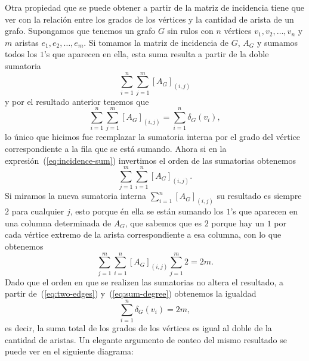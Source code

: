 Otra propiedad que se puede obtener a partir de la matriz de incidencia tiene que ver con la relación entre los grados de los vértices y la cantidad de arista de un grafo.
Supongamos que tenemos un grafo $G$ sin rulos con $n$ vértices $v_1,v_2,\ldots,v_n$ y $m$ aristas $e_1,e_2,\ldots,e_m$.
Si tomamos la matriz de incidencia de $G$, $A_G$ y sumamos todos los $1$'s que aparecen en ella, esta suma resulta a partir de la doble sumatoria
\begin{equation}\label{eq:incidence-sum}
\sum_{i=1}^{n}\sum_{j=1}^{m}[A_G]_{(i,j)}
\end{equation}
y por el resultado anterior tenemos que
\begin{equation}\label{eq:sum-degree}
\sum_{i=1}^{n}\sum_{j=1}^{m}[A_G]_{(i,j)}=\sum_{i=1}^{n}\delta_G(v_i),
\end{equation}
lo único que hicimos fue reemplazar la sumatoria interna por el grado del vértice correspondiente a la fila que se está sumando.
Ahora si en la expresión~(\ref{eq:incidence-sum}) invertimos el orden de las sumatorias obtenemos
\[
\sum_{j=1}^{m}\sum_{i=1}^{n}[A_G]_{(i,j)}.
\]
Si miramos la nueva sumatoria interna $\sum_{i=1}^{n}[A_G]_{(i,j)}$ su resultado es siempre $2$ para cualquier $j$, esto porque én ella se están sumando los $1$'s que aparecen en una columna determinada de $A_G$, que sabemos que es $2$ porque hay un $1$ por cada vértice extremo de la arista correspondiente a esa columna, con lo que obtenemos
\begin{equation}\label{eq:two-edges}
\sum_{j=1}^{m}\sum_{i=1}^{n}[A_G]_{(i,j)}\sum_{j=1}^{m}2=2m.
\end{equation}
Dado que el orden en que se realizen las sumatorias no altera el resultado, a partir de~(\ref{eq:two-edges}) y~(\ref{eq:sum-degree}) obtenemos la igualdad
\[
\sum_{i=1}^{n}\delta_G(v_i)=2m,
\]
es decir, la suma total de los grados de los vértices es igual al doble de la cantidad de aristas.
Un elegante argumento de conteo del mismo resultado se puede ver en el siguiente diagrama:

